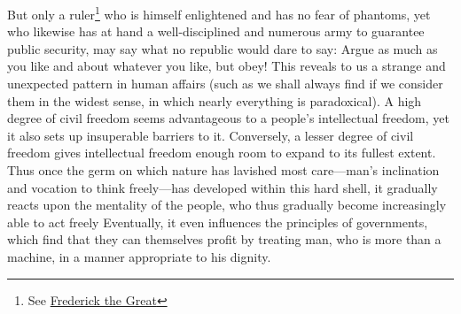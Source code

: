 \documentclass[11pt,twocolumn]{ltugboat}
\begin{document}
But only a ruler\footnote{See  \href{http://en.wikipedia.org/wiki/Frederick_the_Great}{Frederick the Great}} who is himself enlightened and has no fear of phantoms, yet who likewise has at hand a well-disciplined and numerous army to guarantee public security, may say what no republic would dare to say: Argue as much as you like and about whatever you like, but obey! This reveals to us a strange and unexpected pattern in human affairs (such as we shall always find if we consider them in the widest sense, in which nearly everything is paradoxical). A high degree of civil freedom seems advantageous to a people's intellectual freedom, yet it also sets up insuperable barriers to it. Conversely, a lesser degree of civil freedom gives intellectual freedom enough room to expand to its fullest extent. Thus once the germ on which nature has lavished most care—man's inclination and vocation to think freely—has developed within this hard shell, it gradually reacts upon the mentality of the people, who thus gradually become increasingly able to act freely Eventually, it even influences the principles of governments, which find that they can themselves profit by treating man, who is more than a machine, in a manner appropriate to his dignity.
\end{document}
